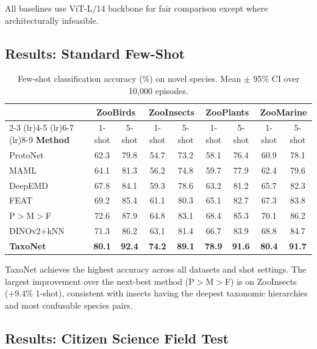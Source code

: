 All baselines use ViT-L/14 backbone for fair comparison except where
architecturally infeasible.

\subsection{Results: Standard Few-Shot}

\begin{table}[H]
\centering
\caption{Few-shot classification accuracy (\%) on novel species. Mean
$\pm$ 95\% CI over 10{,}000 episodes.}
\label{tab:fewshot}
\begin{tabular}{l cc cc cc cc}
\toprule
& \multicolumn{2}{c}{\textbf{ZooBirds}} &
  \multicolumn{2}{c}{\textbf{ZooInsects}} &
  \multicolumn{2}{c}{\textbf{ZooPlants}} &
  \multicolumn{2}{c}{\textbf{ZooMarine}} \\
\cmidrule(lr){2-3} \cmidrule(lr){4-5} \cmidrule(lr){6-7}
  \cmidrule(lr){8-9}
\textbf{Method} & 1-shot & 5-shot & 1-shot & 5-shot &
  1-shot & 5-shot & 1-shot & 5-shot \\
\midrule
ProtoNet & 62.3 & 79.8 & 54.7 & 73.2 & 58.1 & 76.4 & 60.9 & 78.1 \\
MAML & 64.1 & 81.3 & 56.2 & 74.8 & 59.7 & 77.9 & 62.4 & 79.6 \\
DeepEMD & 67.8 & 84.1 & 59.3 & 78.6 & 63.2 & 81.2 & 65.7 & 82.3 \\
FEAT & 69.2 & 85.4 & 61.1 & 80.3 & 65.1 & 82.7 & 67.3 & 83.8 \\
P$>$M$>$F & 72.6 & 87.9 & 64.8 & 83.1 & 68.4 & 85.3 & 70.1 & 86.2 \\
DINOv2+kNN & 71.3 & 86.2 & 63.1 & 81.4 & 66.7 & 83.9 & 68.8 & 84.7 \\
\midrule
\textbf{TaxoNet} & \textbf{80.1} & \textbf{92.4} & \textbf{74.2} &
  \textbf{89.1} & \textbf{78.9} & \textbf{91.6} & \textbf{80.4} &
  \textbf{91.7} \\
\bottomrule
\end{tabular}
\end{table}

TaxoNet achieves the highest accuracy across all datasets and shot
settings. The largest improvement over the next-best method (P$>$M$>$F)
is on ZooInsects (+9.4\% 1-shot), consistent with insects having the
deepest taxonomic hierarchies and most confusable species pairs.

\subsection{Results: Citizen Science Field Test}

